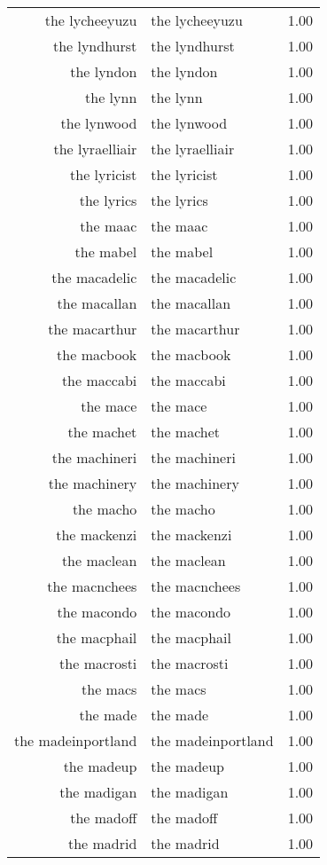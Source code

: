 \begin{table}[ht]
\begin{tabular}{rlr}
  the lycheeyuzu & the lycheeyuzu & 1.00 \\ 
  the lyndhurst & the lyndhurst & 1.00 \\ 
  the lyndon & the lyndon & 1.00 \\ 
  the lynn & the lynn & 1.00 \\ 
  the lynwood & the lynwood & 1.00 \\ 
  the lyraelliair & the lyraelliair & 1.00 \\ 
  the lyricist & the lyricist & 1.00 \\ 
  the lyrics & the lyrics & 1.00 \\ 
  the maac & the maac & 1.00 \\ 
  the mabel & the mabel & 1.00 \\ 
  the macadelic & the macadelic & 1.00 \\ 
  the macallan & the macallan & 1.00 \\ 
  the macarthur & the macarthur & 1.00 \\ 
  the macbook & the macbook & 1.00 \\ 
  the maccabi & the maccabi & 1.00 \\ 
  the mace & the mace & 1.00 \\ 
  the machet & the machet & 1.00 \\ 
  the machineri & the machineri & 1.00 \\ 
  the machinery & the machinery & 1.00 \\ 
  the macho & the macho & 1.00 \\ 
  the mackenzi & the mackenzi & 1.00 \\ 
  the maclean & the maclean & 1.00 \\ 
  the macnchees & the macnchees & 1.00 \\ 
  the macondo & the macondo & 1.00 \\ 
  the macphail & the macphail & 1.00 \\ 
  the macrosti & the macrosti & 1.00 \\ 
  the macs & the macs & 1.00 \\ 
  the made & the made & 1.00 \\ 
  the madeinportland & the madeinportland & 1.00 \\ 
  the madeup & the madeup & 1.00 \\ 
  the madigan & the madigan & 1.00 \\ 
  the madoff & the madoff & 1.00 \\ 
  the madrid & the madrid & 1.00 \\ 

\end{tabular}
\end{table}
